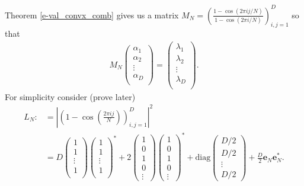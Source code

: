 \documentclass{article}
\renewcommand{\a}{\alpha}
\newcommand{\lam}{\lambda}
\newcommand{\1}{\mathbf{1}}
\newcommand{\0}{\mathbf{0}}
\renewcommand{\l}{\left}
\renewcommand{\r}{\right}
\newcommand{\e}{{\mathbf {{e}}}}
\newcommand{\diag}{\mathrm{diag}}
\begin{document}
Theorem \ref{e-val_convx_comb} gives us a matrix $M_N = \l(\frac{1 - \cos(2 \pi i j/N)}{1 - \cos(2 \pi i/N)} \r)_{i,j = 1}^D$ so that
\begin{align} 
M_N 
\begin{pmatrix} 
\a_1 \\
\a_2 \\
\vdots \\
\a_D \\
\end{pmatrix} 
= 
\begin{pmatrix} 
\lam_1 \\
\lam_2 \\
\vdots \\
\lam_D \\
\end{pmatrix} .
\end{align}
For simplicity consider (prove later)
\begin{align*}
L_N :&= \l| \l(1 - \cos \l( \frac{2 \pi i j}{N} \r) \r)_{i,j = 1}^D \r|^2 \\
&= D \begin{pmatrix} 1 \\ 1 \\ \vdots \\ 1 \\ \end{pmatrix} \begin{pmatrix} 1 \\ 1 \\ \vdots \\ 1 \\ \end{pmatrix}^*
+ 2 \begin{pmatrix} 1 \\ 0 \\ 1 \\ 0 \\ \vdots \end{pmatrix} \begin{pmatrix} 1 \\ 0 \\ 1 \\ 0 \\ \vdots \end{pmatrix}^*
+ \diag \begin{pmatrix} D/2 \\ D/2 \\ \vdots \\ D/2 \end{pmatrix}
+ \frac{D}{2} \e_N \e_N^*.
\end{align*}
\end{document}
